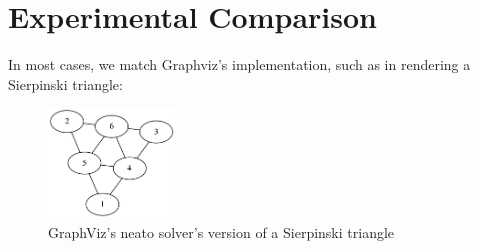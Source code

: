 \documentclass{article}
\begin{document}
\section{Experimental Comparison}

In most cases, we match Graphviz's implementation, such as in rendering a Sierpinski triangle:

\begin{figure}[h!]
\caption{GraphViz's neato solver's version of a Sierpinski triangle}
\centering
\includegraphics[width=0.3\textwidth]{serp.png}
\end{figure}
\end{document}
